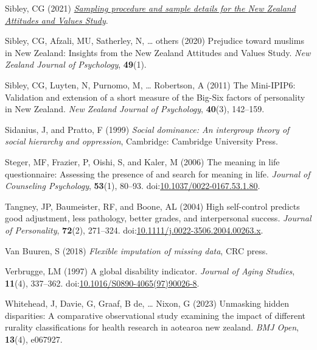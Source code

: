 \documentclass[
  single column]{article}
\newlength{\cslhangindent}
\newenvironment{CSLReferences}[2] %
 {\begin{list}{}{%
  \setlength{\itemindent}{0pt}
  \setlength{\leftmargin}{0pt}
  \setlength{\parsep}{0pt}
  \ifodd #1
   \setlength{\leftmargin}{\cslhangindent}
   \setlength{\itemindent}{-1\cslhangindent}
  \fi
  \setlength{\itemsep}{#2\baselineskip}}}
 {\end{list}}
\begin{document}
\begin{CSLReferences}{1}{0}
Sibley, CG (2021)
\emph{\href{https://doi.org/10.31234/osf.io/wgqvy}{Sampling procedure
and sample details for the {N}ew {Z}ealand {A}ttitudes and {V}alues
{S}tudy}}.

Sibley, CG, Afzali, MU, Satherley, N, \ldots{} others (2020) Prejudice
toward muslims in {N}ew {Z}ealand: Insights from the {N}ew {Z}ealand
{A}ttitudes and {V}alues {S}tudy. \emph{New Zealand Journal of
Psychology}, \textbf{49}(1).

Sibley, CG, Luyten, N, Purnomo, M, \ldots{} Robertson, A (2011) The
Mini-IPIP6: Validation and extension of a short measure of the Big-Six
factors of personality in {N}ew {Z}ealand. \emph{New Zealand Journal of
Psychology}, \textbf{40}(3), 142--159.

Sidanius, J, and Pratto, F (1999) \emph{Social dominance: An intergroup
theory of social hierarchy and oppression}, Cambridge: Cambridge
University Press.

Steger, MF, Frazier, P, Oishi, S, and Kaler, M (2006) The meaning in
life questionnaire: Assessing the presence of and search for meaning in
life. \emph{Journal of Counseling Psychology}, \textbf{53}(1), 80--93.
doi:\href{https://doi.org/10.1037/0022-0167.53.1.80}{10.1037/0022-0167.53.1.80}.

Tangney, JP, Baumeister, RF, and Boone, AL (2004) High self-control
predicts good adjustment, less pathology, better grades, and
interpersonal success. \emph{Journal of Personality}, \textbf{72}(2),
271--324.
doi:\href{https://doi.org/10.1111/j.0022-3506.2004.00263.x}{10.1111/j.0022-3506.2004.00263.x}.

Van Buuren, S (2018) \emph{Flexible imputation of missing data}, CRC
press.

Verbrugge, LM (1997) A global disability indicator. \emph{Journal of
Aging Studies}, \textbf{11}(4), 337--362.
doi:\href{https://doi.org/10.1016/S0890-4065(97)90026-8}{10.1016/S0890-4065(97)90026-8}.

Whitehead, J, Davie, G, Graaf, B de, \ldots{} Nixon, G (2023) Unmasking
hidden disparities: A comparative observational study examining the
impact of different rurality classifications for health research in
aotearoa new zealand. \emph{BMJ Open}, \textbf{13}(4), e067927.

\end{CSLReferences}
\end{document}
